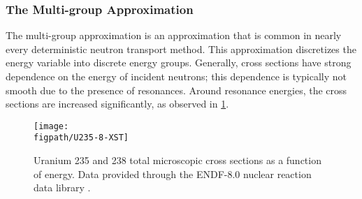 {{{            \subsubsection{The Multi-group Approximation}{\label{sssec:NTT:The Multi-group Approximation}
                The multi-group approximation is an approximation that is common in nearly every deterministic neutron transport method.
                This approximation discretizes the energy variable into discrete energy groups.
                Generally, cross sections have strong dependence on the energy of incident neutrons; this dependence is typically not smooth due to the presence of resonances.
                Around resonance energies, the cross sections are increased significantly, as observed in \cref{fig:NTT:Cross Section plot}.

                \begin{figure}[h]
                    \centering
                    \texttt{[image: \\figpath/U235-8-XST]}
                    \caption{Uranium 235 and 238 total microscopic cross sections as a function of energy. Data provided through the ENDF-8.0 nuclear reaction data library \cite{ENDF8}.}
                    \label{fig:NTT:Cross Section plot}
                \end{figure}

}}}}
